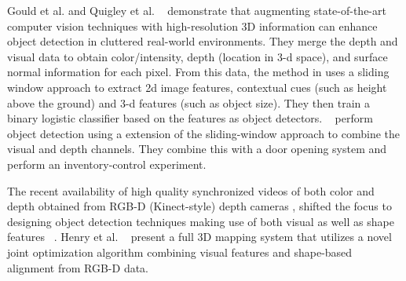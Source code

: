 \documentclass[11pt]{article} %
\begin{document}
   Gould et al.  \cite{gould:fusion} and Quigley et al. ~\cite{quigley:high-accuracy} demonstrate that augmenting state-of-the-art
   computer vision techniques with high-resolution 3D information can enhance object detection in cluttered real-world environments. 
   They merge the depth and visual data to obtain color/intensity, depth (location in 3-d space),  and surface normal information
   for each pixel. From this data, the method in \cite{gould:fusion} uses a sliding window approach to extract  2d image features, 
   contextual cues (such as height above the ground) and 3-d features (such as object size). They then train a binary logistic 
   classifier based on the features as object detectors. ~\cite{quigley:high-accuracy} perform object detection using a extension of 
   the sliding-window  approach to combine the visual and depth channels. They combine this with a door opening system and 
   perform an inventory-control experiment. 

   The recent availability of high quality synchronized videos of both color and depth obtained from RGB-D (Kinect-style) 
    depth cameras \cite{kinect}, shifted the focus to designing object detection techniques making use of both visual as well as 
    shape features ~\cite{lai:icra11a, lai:icra11b}. Henry et al. ~\cite{deter:rgbd} present a full 3D mapping system
    that utilizes a novel joint optimization algorithm combining visual features and shape-based alignment from RGB-D data.

 
 \small
 

\end{document}
